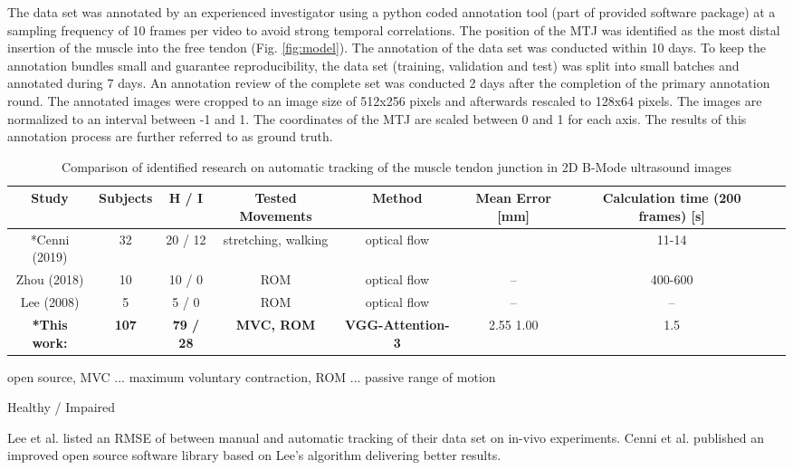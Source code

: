 \documentclass[letterpaper, 10 pt, conference]{ieeeconf}
\begin{document}
The data set was annotated by an experienced investigator using a python coded annotation tool (part of provided software package) at a sampling frequency of 10 frames per video to avoid strong temporal correlations. The position of the MTJ was identified as the most distal insertion of the muscle into the free tendon (Fig. \ref{fig:model}). The annotation of the data set was conducted within 10 days. To keep the annotation bundles small and guarantee reproducibility, the data set (training, validation and test) was split into small batches and annotated during 7 days. An annotation review of the complete set was conducted 2 days after the completion of the primary annotation round. The annotated images were cropped to an image size of 512x256 pixels and afterwards rescaled to 128x64 pixels. The images are normalized to an interval between -1 and 1. The coordinates of the MTJ are scaled between 0 and 1 for each axis. The results of this annotation process are further referred to as ground truth.
\begin{table*}[thpb]
\caption{Comparison of identified research on automatic tracking of the muscle tendon junction in 2D B-Mode ultrasound images}
\centering
\label{tab:algorithms}
\begin{center}
\setlength{\tabcolsep}{3pt} \renewcommand{\arraystretch}{1.5}
\begin{tabular}{cccccccc}
\toprule
\textbf{Study}  & \textbf{Subjects} & \textbf{H / I}   & \textbf{Tested Movements}  & \textbf{Method}  &\textbf{Mean Error [mm]}    &\textbf{Calculation time (200 frames)  [s] }\\ 
\midrule
*Cenni (2019) \cite{j:Cenni2019} &32 & 20 / 12   &stretching, walking    &optical flow &  &11-14\\
Zhou (2018) \cite{j:Zhou2018}   &10   &10 / 0   &ROM  &optical flow  &--    &400-600\\ 
Lee (2008) \cite{j:Lee2008} &5 &5 / 0 &ROM &optical flow  &--    &--  \\  
\textbf{*This work:} & \textbf{107}   & \textbf{79 / 28}  &\textbf{MVC, ROM}  &\textbf{VGG-Attention-3} &2.55  1.00 &1.5\\
\bottomrule
\end{tabular}
 \begin{tablenotes}
    \item * open source, MVC ... maximum voluntary contraction, ROM ... passive range of motion
    \item  Healthy / Impaired
    \item  Lee et al. \cite{j:Lee2008} listed an RMSE of  between manual and automatic tracking of their data set on in-vivo experiments. Cenni et al. \cite{j:Cenni2019} published an improved open source software library based on Lee's algorithm delivering better results.
    \end{tablenotes}
\end{center}
\end{table*}
\end{document}
